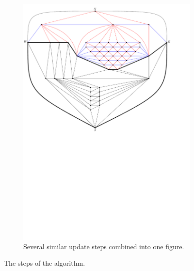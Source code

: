 \begin{figure}
\begin{subfigure}[b]{.9 \textwidth}
      \includegraphics[width=\textwidth]{examples/img/vertWorstCase/sweep4}
      \caption{Several similar update steps combined into one figure.}
      \label{fig:ex:vert:sweep4}
    \end{subfigure}
    \caption{The steps of the algorithm.}
\end{figure}

